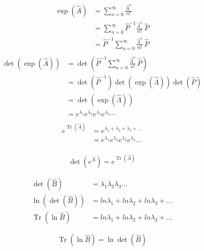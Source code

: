 \documentclass[12pt, letterpaper]{article}
\begin{document}
\begin{align*}
    \exp\left(\hat{A}\right) & = \sum_{n=0}^\infty \frac{\hat{A}^n} {n!} \\ 
    &= \sum_{n=0}^\infty  \hat{P}^{-1} \frac{\hat{\Lambda}^n} {n!}\, \hat{P}\\
    &= \hat{P}^{-1} \sum_{n=0}^\infty  \frac{\hat{\Lambda}^n} {n!}\, \hat{P}\\
\end{align*}
\begin{align*}
    \operatorname{det}\left(\exp\left(\hat{A}\right) \right)&= \operatorname{det}\left(\hat{P}^{-1} \sum_{n=0}^\infty  \frac{\hat{\Lambda}^n} {n!}\, \hat{P} \right)\\
    &= \operatorname{det}\left(\hat{P}^{-1}\right)\operatorname{det}\left(\exp\left(\hat \Lambda\right)\right)\operatorname{det}\left(\hat{P}\right)\\
    &= \operatorname{det}\left(\exp\left(\hat \Lambda\right)\right)\\
    &= e^{\lambda_1}e^{\lambda_2}e^{\lambda_3}e^{\lambda_4}\cdots\\
\end{align*}
\begin{align*}
    e^{\operatorname{Tr} \left(\hat{A}\right)}&=e^{\lambda_1+\lambda_2+\lambda_3+\ldots} \\
    &= e^{\lambda_1}e^{\lambda_2}e^{\lambda_3}e^{\lambda_4}\ldots\\
\end{align*}

\begin{equation*}\boxed{
    \operatorname{det}\left(e^{\hat{A}}\right)=e^{\operatorname{Tr}(\hat{A})}}
\end{equation*}

\begin{align*}
    \operatorname{det}\left(\hat{B} \right) &= \lambda_1 \lambda_2 \lambda_3 \ldots\\
    \ln\left(\operatorname{det}\left(\hat{B} \right)\right) & = ln \lambda_1+ ln \lambda_2+ ln \lambda_3+\ldots\\
    \operatorname{Tr}\left( \ln{\hat{B}} \right) &=  ln \lambda_1+ ln \lambda_2+ ln \lambda_3+\ldots
\end{align*}

\begin{equation*}
\boxed{ \operatorname{Tr}\left( \ln{\hat{B}} \right) = \ln{\operatorname{det}\left(\hat{B}\right)}}
\end{equation*}
\end{document}
